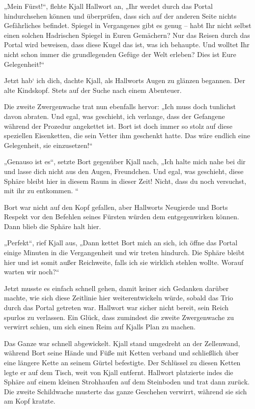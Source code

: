 „Mein Fürst!“, flehte Kjall Hallwort an, „Ihr werdet durch das Portal hindurchsehen können und überprüfen, dass sich auf der anderen Seite nichts Gefährliches befindet. Spiegel in Vergangenes gibt es genug – habt Ihr nicht selbst einen solchen Hadrischen Spiegel in Euren Gemächern? Nur das Reisen durch das Portal wird beweisen, dass diese Kugel das ist, was ich behaupte. Und wolltet Ihr nicht schon immer die grundlegenden Gefüge der Welt erleben? Dies ist Eure Gelegenheit!“

Jetzt hab‘ ich dich, dachte Kjall, als Hallworts Augen zu glänzen begannen. Der alte Kindskopf. Stets auf der Suche nach einem Abenteuer.

Die zweite Zwergenwache trat nun ebenfalls hervor: „Ich muss doch tunlichst davon abraten. Und egal, was geschieht, ich verlange, dass der Gefangene während der Prozedur angekettet ist. Bort ist doch immer so stolz auf diese speziellen Eisenketten, die sein Vetter ihm geschenkt hatte. Das wäre endlich eine Gelegenheit, sie einzusetzen!“

„Genauso ist es“, setzte Bort gegenüber Kjall nach, „Ich halte mich nahe bei dir und lasse dich nicht aus den Augen, Freundchen. Und egal, was geschieht, diese Sphäre bleibt hier in diesem Raum in dieser Zeit! Nicht, dass du noch versuchst, mit ihr zu entkommen. “

Bort war nicht auf den Kopf gefallen, aber Hallworts Neugierde und Borts Respekt vor den Befehlen seines Fürsten würden dem entgegenwirken können. Dann blieb die Sphäre halt hier.

„Perfekt“, rief Kjall aus, „Dann kettet Bort mich an sich, ich öffne das Portal einige Minuten in die Vergangenheit und wir treten hindurch. Die Sphäre bleibt hier und ist somit außer Reichweite, falls ich sie wirklich stehlen wollte. Worauf warten wir noch?“

Jetzt musste es einfach schnell gehen, damit keiner sich Gedanken darüber machte, wie sich diese Zeitlinie hier weiterentwickeln würde, sobald das Trio durch das Portal getreten war. Hallwort war sicher nicht bereit, sein Reich spurlos zu verlassen. Ein Glück, dass zumindest die zweite Zwergenwache zu verwirrt schien, um sich einen Reim auf Kjalls Plan zu machen.\bigskip



Das Ganze war schnell abgewickelt. Kjall stand umgedreht an der Zellenwand, während Bort seine Hände und Füße mit Ketten verband und schließlich über eine längere Kette an seinem Gürtel befestigte. Der Schlüssel zu diesen Ketten legte er auf dem Tisch, weit von Kjall entfernt. Hallwort platzierte indes die Sphäre auf einem kleinen Strohhaufen auf dem Steinboden und trat dann zurück. Die zweite Schildwache musterte das ganze Geschehen verwirrt, während sie sich am Kopf kratzte.

